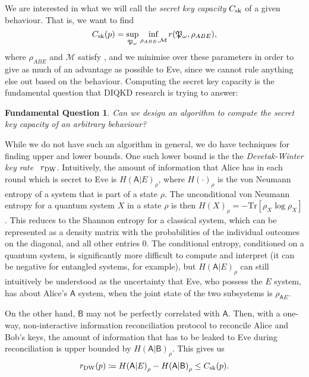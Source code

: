 \documentclass[10pt, a4paper]{article}
\numberwithin{equation}{section} %
\theoremstyle{definition}
\theoremstyle{plain}
\newtheorem{funqn}{Fundamental Question}
\newcommand{\?}{\mathrel{?}} %
\newcommand{\Tr}{\mathrm{Tr}} %
\newcommand{\sM}{\mathcal{M}}
\newcommand{\crv}[1]{\mathsf{#1}}
\newcommand{\sk}{\rm sk}
\newcommand{\DW}{\rm DW}
\begin{document}
    We are interested in what we will call the \emph{secret key capacity} \(C_{\sk}\) of a given behaviour. That is, we want to find 
    \begin{equation}\label{eqn:seckeycap}
      C_{\sk}(p) = \sup_{\mathfrak{P}_{\omega}} \inf_{ 
          \rho_{A B E}, \sM
      } r(\mathfrak{P}_{\omega}, \rho_{ABE}),
    \end{equation}
    where \(\rho_{A B E}\) and \(\sM\) satisfy , and we minimise over these parameters in order to give as much of an advantage as possible to Eve, since we cannot rule anything else out based on the behaviour. Computing the secret key capacity is the fundamental question that DIQKD research is trying to answer:
    \begin{funqn}\label{fqn:cap}
      Can we design an algorithm to compute the secret key capacity of an arbitrary behaviour?
    \end{funqn}

    While we do not have such an algorithm in general, we do have techniques for finding upper and lower bounds. One such lower bound is the the \emph{Devetak-Winter key rate}~\cite{DevetakWinter} \(r_{\DW}\). Intuitively, the amount of information that Alice has in each round which is secret to Eve is \({H(\crv{A}|E)}_{\rho}\), where \({H(\cdot)}_{\rho}\) is the von Neumann entropy of a system that is part of a state \(\rho\). The unconditional von Neumann entropy for a quantum system \(X\) in a state \(\rho\) is then \({H(X)}_{\rho} = -\Tr\left[\rho_{X}\log\rho_{X}\right]\). This reduces to the Shannon entropy for a classical system, which can be represented as a density matrix with the probabilities of the individual outcomes on the diagonal, and all other entries 0. The conditional entropy, conditioned on a quantum system, is significantly more difficult to compute and interpret (it can be negative for entangled systems, for example), but \({H(\crv{A}|E)}_{\rho}\) can still intuitively be understood as the uncertainty that Eve, who possess the \(E\) system, has about Alice's \(\crv{A}\) system, when the joint state of the two subsystems is \(\rho_{\crv{A}E}\).

    On the other hand, \(\crv{B}\) may not be perfectly correlated with \(\crv{A}\). Then, with a one-way, non-interactive information reconciliation protocol to reconcile Alice and Bob's keys, the amount of information that has to be leaked to Eve during reconciliation is upper bounded by \({H(\crv{A}|\crv{B})}_{\rho}\). This gives us
    \begin{equation}
      r_{\DW}(p) \coloneqq {H(\crv{A}|E)}_{\rho} - {H(\crv{A}|\crv{B})}_{\rho} \leq C_{\sk}(p).
    \end{equation}
\end{document}
